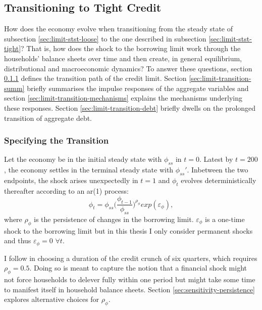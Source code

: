 \documentclass[a4paper,12pt]{article} %
\numberwithin{equation}{section} %
\numberwithin{figure}{section}
\numberwithin{table}{section}
\begin{document}
\subsection{Transitioning to Tight Credit}
\label{sec:limit-transition}

How does the economy evolve when transitioning from the steady state of subsection \ref{sec:limit-stst-loose} to the one described in subsection \ref{sec:limit-stst-tight}? That is, how does the shock to the borrowing limit work through the households' balance sheets over time and then create, in general equilibrium, distributional and macroeconomic dynamics? To answer these questions, section \ref{sec:limit-transition-specific} defines the transition path of the credit limit. Section \ref{sec:limit-transition-summ} briefly summarises the impulse responses of the aggregate variables and section \ref{sec:limit-transition-mechanisms} explains the mechanisms underlying these responses. Section \ref{sec:limit-transition-debt} briefly dwells on the prolonged transition of aggregate debt.

\subsubsection{Specifying the Transition}
\label{sec:limit-transition-specific}

Let the economy be in the initial steady state with $\phi_{ss}$ in $t=0$. Latest by $t=200$, the economy settles in the terminal steady state with $\phi_{ss}'$. Inbetween the two endpoints, the shock arises unexpectedly in $t=1$ and $\phi_t$ evolves deterministically thereafter according to an \Gls{ar}(1) process:
\begin{equation}
    \phi_t = \phi_{ss} \Bigg( \frac{\phi_{t-1}}{\phi_{ss}} \Bigg)^{\rho_{\phi}} exp(\varepsilon_{\phi}), \label{eq:borrowing-limit-process}
\end{equation}
where $\rho_{\phi}$ is the persistence of changes in the borrowing limit. $\varepsilon_{\phi}$ is a one-time shock to the borrowing limit but in this thesis I only consider permanent shocks and thus $\varepsilon_{\phi} = 0$ $\forall t$.

I follow \textcite{gl2017} in choosing a duration of the credit crunch of six quarters, which requires $\rho_{\phi} = 0.5$. Doing so is meant to capture the notion that a financial shock might not force households to delever fully within one period but might take some time to manifest itself in household balance sheets. Section \ref{sec:sensitivity-persistence} explores alternative choices for $\rho_{\phi}$.
\end{document}
